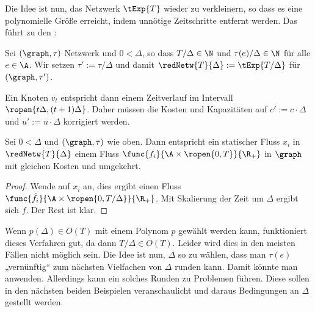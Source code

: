Die Idee ist nun, das Netzwerk $\tExp{T}$ wieder zu verkleinern, so dass es
eine polynomielle Größe erreicht, indem unnötige Zeitschritte entfernt werden.
Das führt zu den :

\begin{definition}\label{def:red_network}
    Sei $(\graph, \tau)$ Netzwerk und $0 < \Delta$, so dass $T/\Delta \in \N$
    und $\tau(e)/\Delta \in \N$ für alle $e \in \A$. Wir setzen
    $\tau' := \tau/\Delta$ und damit
    $\redNetw{T}{\Delta} := \tExp{T/\Delta}$ für $(\graph, \tau')$.
    
    Ein Knoten $v_t$ entspricht dann einem Zeitverlauf im Intervall
    $\ropen{t \Delta, (t+1) \Delta}$. Daher müssen die Kosten und Kapazitäten
    auf $c' := c \cdot \Delta$ und $u' := u \cdot \Delta$ korrigiert werden.
\end{definition}

\begin{lemma}\label{lem:reduced_static_dyn_conv}
    Sei $0 < \Delta$ und $(\graph, \tau)$ wie oben. Dann entspricht ein statischer
    Fluss $x_i$ in $\redNetw{T}{\Delta}$ einem Fluss
    $\func{f_i}{\A \times \ropen{0, T}}{\R_+}$ in $\graph$ mit gleichen Kosten
    und umgekehrt.
    
    \begin{proof}
        Wende  auf $x_i$ an, dies ergibt einen Fluss
        $\func{\hat{f}_i}{\A \times \ropen{0, T/\Delta}}{\R_+}$. Mit Skalierung der
        Zeit um $\Delta$ ergibt sich $f$. Der Rest ist klar.
    \end{proof}
\end{lemma}

Wenn $p(\Delta) \in O(T)$ mit einem Polynom $p$ gewählt werden kann, funktioniert
dieses Verfahren gut, da dann $T/\Delta \in O(T)$. Leider wird dies in den meisten
Fällen nicht möglich sein.
Die Idee ist nun, $\Delta$ so zu wählen, dass man $\tau(e)$ „vernünftig“ zum
nächsten Vielfachen von $\Delta$ runden kann. Damit könnte man
 anwenden. Allerdings kann ein solches
Runden zu Problemen führen. Diese sollen in den nächsten beiden Beispielen
veranschaulicht und daraus Bedingungen an $\Delta$ gestellt werden.

